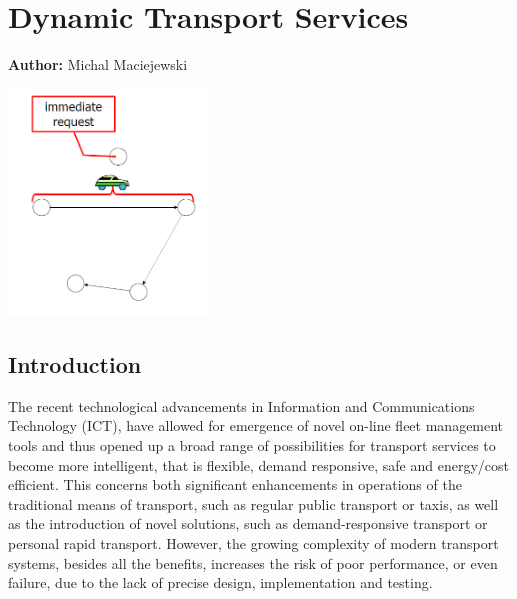 \chapter{Dynamic Transport Services}
\label{ch:dts}

\hfill \textbf{Author:} Michal Maciejewski

\begin{center} \includegraphics[width=0.4\textwidth, angle=0]{extending/figures/DTS/dts.png}  \end{center}




\section{Introduction}

The recent technological advancements in Information and Communications Technology (ICT), have allowed for emergence of novel on-line fleet management tools and thus opened up a broad range of possibilities for transport services to become more intelligent, that is flexible, demand responsive, safe and energy/cost efficient. This concerns both significant enhancements in operations of the traditional means of transport, such as regular public transport or taxis, as well as the introduction of novel solutions, such as demand-responsive transport or personal rapid transport. However, the growing complexity of modern transport systems, besides all the benefits, increases the risk of poor performance, or even failure, due to the lack of precise design, implementation and testing.

